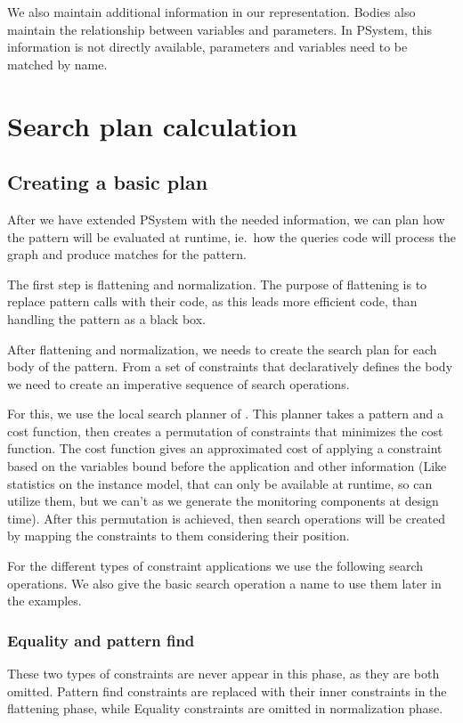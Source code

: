 We also maintain additional information in our representation. 
Bodies also maintain the relationship between variables and parameters. 
In PSystem, this information is not directly available, parameters and variables need to be matched by name.

\section{Search plan calculation}

\subsection{Creating a basic plan}
After we have extended PSystem with the needed information, we can plan how the pattern will be evaluated at runtime, ie.\ how the queries code will process the graph and produce matches for the pattern.

The first step is flattening and normalization. 
The purpose of flattening is to replace pattern calls with their code, as this leads more efficient code, than handling the pattern as a black box.

After flattening and normalization, we needs to create the search plan for each body of the pattern. From a set of constraints that declaratively defines the body we need to create an imperative sequence of search operations.

For this, we use the local search planner of \viatra{}.
This planner takes a pattern and a cost function, then creates a permutation of constraints that minimizes the cost function. 
The cost function gives an approximated cost of applying a constraint based on the variables bound before the application and other information (Like statistics on the instance model, that can only be available at runtime, so \viatra{} can utilize them, but we can't as we generate the monitoring components at design time). 
After this permutation is achieved, then search operations will be created by mapping the constraints to them considering their position.

For the different types of constraint applications we use the following search operations. We also give the basic search operation a name to use them later in the examples.


\subsubsection{Equality and pattern find}
These two types of constraints are never appear in this phase, as they are both omitted. Pattern find constraints are replaced with their inner constraints in the flattening phase, while Equality constraints are omitted in normalization phase.


